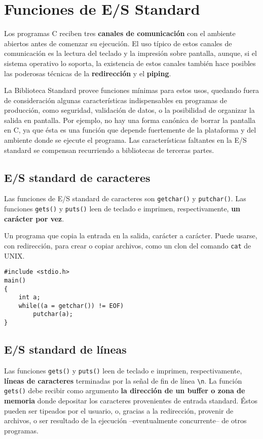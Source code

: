 \section{Funciones de E/S Standard}
\label{sec:esstandard}
Los programas C reciben tres \textbf{canales de comunicación} con el ambiente abiertos
antes de comenzar su ejecución. El uso típico de estos canales de comunicación
es la lectura del teclado y la impresión sobre pantalla, aunque, si el sistema
operativo lo soporta, la existencia de estos canales también hace posibles las poderosas técnicas de la
\textbf{redirección} y el \textbf{piping}. 


La Biblioteca Standard provee funciones mínimas para estos usos,
quedando fuera de consideración algunas características indispensables en
programas de producción, como seguridad, validación de datos, o la posibilidad de
organizar la salida en pantalla. Por ejemplo, no hay una forma canónica de
borrar la pantalla en C, ya que ésta es una función que depende fuertemente de
la plataforma y del ambiente donde se ejecute el programa. Las características faltantes en la
E/S standard se compensan recurriendo a bibliotecas de terceras partes.

\subsection{E/S standard de caracteres}
\label{subsec:esstandardcaract}
Las funciones de E/S standard de caracteres son \lstinline{getchar()} y \lstinline{putchar()}. Las funciones \lstinline{gets()} y \lstinline{puts()} leen de teclado e imprimen, respectivamente, \textbf{un carácter por vez}.

\begin{ejemplo}
Un programa que copia la entrada en la salida, carácter a
carácter. Puede usarse, con redirección, para crear o copiar archivos, como un
clon del comando \lstinline{cat} de UNIX.

\begin{lstlisting}
#include <stdio.h>
main()
{
    int a;
    while((a = getchar()) != EOF)
        putchar(a);
}
\end{lstlisting}
\end{ejemplo}

\subsection{E/S standard de líneas}
\label{subsec:esstandardlineas}
Las funciones \lstinline{gets()} y \lstinline{puts()} leen de teclado e imprimen, respectivamente,
\textbf{líneas de caracteres} terminadas por la señal de fin de línea \lstinline{\n}. La función
\lstinline{gets()} debe recibir como argumento \textbf{la dirección de un buffer o zona de memoria}
donde depositar los caracteres provenientes de entrada standard. Éstos pueden ser tipeados por 
el usuario, o, gracias a la redirección, provenir de archivos, o ser
resultado de la ejecución --eventualmente concurrente-- de otros programas. 


